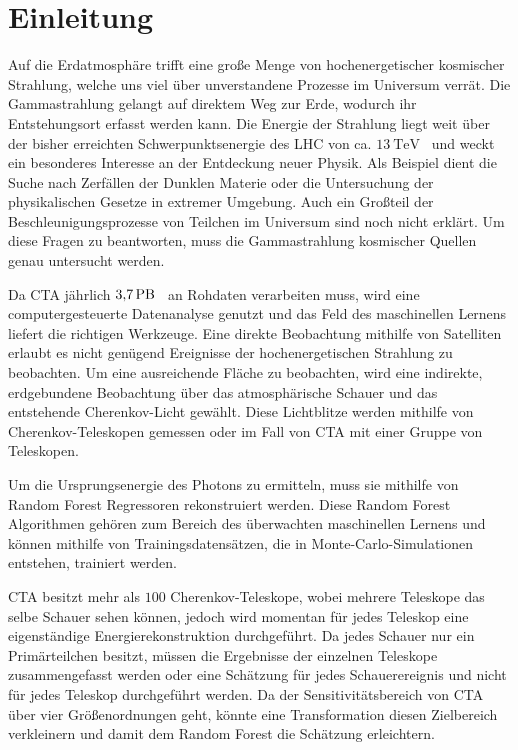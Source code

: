 \chapter{Einleitung}

Auf die Erdatmosphäre trifft eine große Menge von hochenergetischer kosmischer Strahlung, welche uns viel über unverstandene
Prozesse im Universum verrät.
Die Gammastrahlung gelangt auf direktem Weg zur Erde, wodurch ihr Entstehungsort erfasst werden kann.
Die Energie der Strahlung liegt weit über der bisher erreichten Schwerpunktsenergie des LHC von ca. $\SI{13}{\tera\eV}$~\cite{LHC} und weckt
ein besonderes Interesse an der Entdeckung neuer Physik.
Als Beispiel dient die Suche nach Zerfällen der Dunklen Materie oder die Untersuchung der physikalischen Gesetze in extremer Umgebung.
Auch ein Großteil der Beschleunigungsprozesse von Teilchen im Universum sind noch nicht erklärt.
Um diese Fragen zu beantworten, muss die Gammastrahlung kosmischer Quellen genau untersucht werden.

Da CTA jährlich $\SI{3.7}{\peta\byte}$~\cite{Rohdaten} an Rohdaten verarbeiten muss, wird eine computergesteuerte Datenanalyse
genutzt und das Feld des maschinellen Lernens liefert die richtigen Werkzeuge.
Eine direkte Beobachtung mithilfe von Satelliten erlaubt es nicht genügend Ereignisse der hochenergetischen Strahlung zu beobachten.
Um eine ausreichende Fläche zu beobachten, wird eine indirekte, erdgebundene Beobachtung über das atmosphärische Schauer und das
entstehende Cherenkov-Licht gewählt.
Diese Lichtblitze werden mithilfe von Cherenkov-Teleskopen gemessen oder im Fall von CTA mit einer Gruppe von Teleskopen.

Um die Ursprungsenergie des Photons zu ermitteln, muss sie mithilfe von Random Forest Regressoren rekonstruiert werden.
Diese Random Forest Algorithmen gehören zum Bereich des überwachten maschinellen Lernens und können mithilfe von Trainingsdatensätzen,
die in Monte-Carlo-Simulationen entstehen, trainiert werden.

CTA besitzt mehr als $\num{100}$ Cherenkov-Teleskope, wobei mehrere Teleskope das selbe Schauer sehen können, jedoch wird momentan für jedes Teleskop eine eigenständige
Energierekonstruktion durchgeführt.
Da jedes Schauer nur ein Primärteilchen besitzt, müssen die Ergebnisse der einzelnen Teleskope zusammengefasst werden oder
eine Schätzung für jedes Schauerereignis und nicht für jedes Teleskop durchgeführt werden.
Da der Sensitivitätsbereich von CTA über vier Größenordnungen geht, könnte eine Transformation diesen Zielbereich verkleinern und
damit dem Random Forest die Schätzung erleichtern.

